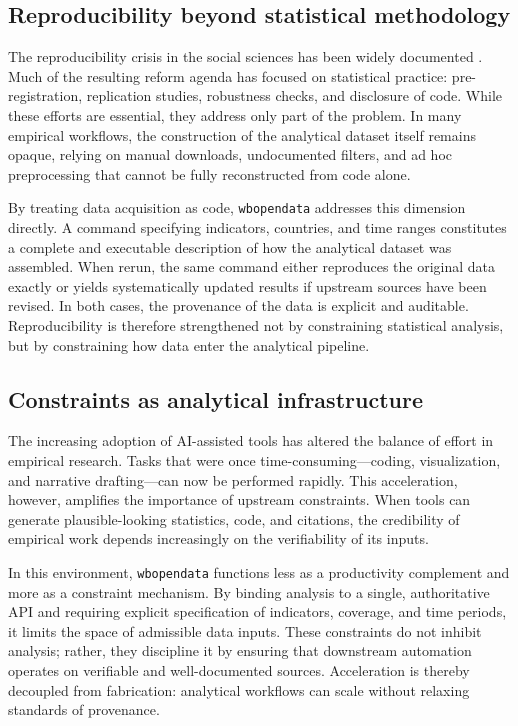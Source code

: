 \documentclass[bib]{statapress}
\begin{document}
\subsection{Reproducibility beyond statistical methodology}

The reproducibility crisis in the social sciences has been widely documented
\citep{baker2016reproducibility,opensc2015estimating}. Much of the resulting reform
agenda has focused on statistical practice: pre-registration, replication
studies, robustness checks, and disclosure of code. While these efforts are
essential, they address only part of the problem. In many empirical workflows,
the construction of the analytical dataset itself remains opaque, relying on
manual downloads, undocumented filters, and ad hoc preprocessing that cannot be
fully reconstructed from code alone.

By treating data acquisition as code, \texttt{wbopendata} addresses this
dimension directly. A command specifying indicators, countries, and time ranges
constitutes a complete and executable description of how the analytical dataset
was assembled. When rerun, the same command either reproduces the original data
exactly or yields systematically updated results if upstream sources have been
revised. In both cases, the provenance of the data is explicit and auditable.
Reproducibility is therefore strengthened not by constraining statistical
analysis, but by constraining how data enter the analytical pipeline.

\subsection{Constraints as analytical infrastructure}

The increasing adoption of AI-assisted tools has altered the balance of effort
in empirical research. Tasks that were once time-consuming—coding, visualization,
and narrative drafting—can now be performed rapidly. This acceleration,
however, amplifies the importance of upstream constraints. When tools can
generate plausible-looking statistics, code, and citations, the credibility of
empirical work depends increasingly on the verifiability of its inputs.

In this environment, \texttt{wbopendata} functions less as a productivity
complement and more as a constraint mechanism. By binding analysis to a single,
authoritative API and requiring explicit specification of indicators, coverage,
and time periods, it limits the space of admissible data inputs. These constraints
do not inhibit analysis; rather, they discipline it by ensuring that downstream
automation operates on verifiable and well-documented sources. Acceleration is
thereby decoupled from fabrication: analytical workflows can scale without
relaxing standards of provenance.
\end{document}
